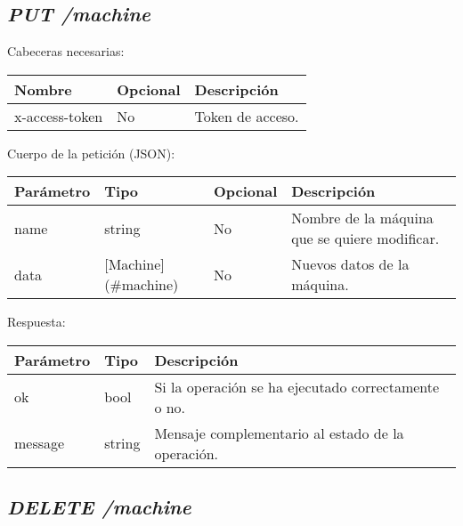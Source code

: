 \subsection{\textit{PUT /machine}}

Cabeceras necesarias:
\begin{table}[h!]
	\centering
	\begin{adjustbox}{max width=\textwidth}
	\begin{tabular}{|l|l|l|}
		\hline
		Nombre & Opcional & Descripción \\ \hline
		x-access-token & No & Token de acceso. \\ \hline
	\end{tabular}
\end{adjustbox}
\end{table}

Cuerpo de la petición (JSON):
\begin{table}[!h]
	\centering
	\begin{adjustbox}{max width=\textwidth}
	\begin{tabular}{|l|l|l|l|}
		\hline
		Parámetro & Tipo & Opcional & Descripción \\ \hline
		name & string & No & Nombre de la máquina que se quiere modificar. \\ \hline
		data & [Machine](\#machine) & No & Nuevos datos de la máquina. \\ \hline
	\end{tabular}
\end{adjustbox}
\end{table}


Respuesta:
\begin{table}[!h]
	\centering
	\begin{adjustbox}{max width=\textwidth}
	\begin{tabular}{|l|l|l|}
		\hline
		Parámetro & Tipo & Descripción \\ \hline
		ok & bool & Si la operación se ha ejecutado correctamente o no. \\ \hline
		message & string & Mensaje complementario al estado de la operación. \\ \hline
	\end{tabular}
\end{adjustbox}
\end{table}

\subsection{\textit{DELETE /machine}}

